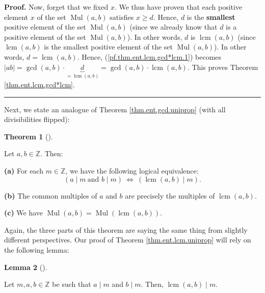 \documentclass[numbers=enddot,12pt,final,onecolumn,notitlepage]{scrartcl}%
\numberwithin{exer}{subsection}
\theoremstyle{definition}
\newtheorem{theo}{Theorem}[subsection]
\newenvironment{theorem}[1][]
{\begin{theo}[#1]\begin{leftbar}}
{\end{leftbar}\end{theo}}
\newtheorem{lem}[theo]{Lemma}
\newenvironment{lemma}[1][]
{\begin{lem}[#1]\begin{leftbar}}
{\end{leftbar}\end{lem}}
\newenvironment{proof}[1][Proof]{\noindent\textbf{#1.} }{\ \rule{0.5em}{0.5em}}
\begin{document}
\begin{proof}
Now, forget that we fixed $x$. We thus have proven that each positive element
$x$ of the set $\operatorname*{Mul}\left(  a,b\right)  $ satisfies $x\geq d$.
Hence, $d$ is the \textbf{smallest} positive element of the set
$\operatorname*{Mul}\left(  a,b\right)  $ (since we already know that $d$ is a
positive element of the set $\operatorname*{Mul}\left(  a,b\right)  $). In
other words, $d$ is $\operatorname{lcm}\left(  a,b\right)  $ (since
$\operatorname{lcm}\left(  a,b\right)  $ is the smallest positive element of
the set $\operatorname*{Mul}\left(  a,b\right)  $). In other words,
$d=\operatorname{lcm}\left(  a,b\right)  $. Hence,
(\ref{pf.thm.ent.lcm.gcd*lcm.1}) becomes $\left\vert ab\right\vert
=\gcd\left(  a,b\right)  \cdot\underbrace{d}_{=\operatorname{lcm}\left(
a,b\right)  }=\gcd\left(  a,b\right)  \cdot\operatorname{lcm}\left(
a,b\right)  $. This proves Theorem \ref{thm.ent.lcm.gcd*lcm}.
\end{proof}

Next, we state an analogue of Theorem \ref{thm.ent.gcd.uniprop} (with all
divisibilities flipped):

\begin{theorem}
\label{thm.ent.lcm.uniprop}Let $a,b\in\mathbb{Z}$. Then:

\textbf{(a)} For each $m\in\mathbb{Z}$, we have the following logical
equivalence:%
\begin{equation}
\left(  a\mid m\ \text{and }b\mid m\right)  \ \Longleftrightarrow\ \left(
\operatorname{lcm}\left(  a,b\right)  \mid m\right)  .
\label{eq.thm.ent.lcm.uniprop.equiv}%
\end{equation}


\textbf{(b)} The common multiples of $a$ and $b$ are precisely the multiples
of $\operatorname{lcm}\left(  a,b\right)  $.

\textbf{(c)} We have $\operatorname*{Mul}\left(  a,b\right)
=\operatorname*{Mul}\left(  \operatorname{lcm}\left(  a,b\right)  \right)  $.
\end{theorem}

Again, the three parts of this theorem are saying the same thing from slightly
different perspectives. Our proof of Theorem \ref{thm.ent.lcm.uniprop} will
rely on the following lemma:

\begin{lemma}
\label{lem.ent.lcm.uniprop}Let $m,a,b\in\mathbb{Z}$ be such that $a\mid m$ and
$b\mid m$. Then, $\operatorname{lcm}\left(  a,b\right)  \mid m$.
\end{lemma}
\end{document}
